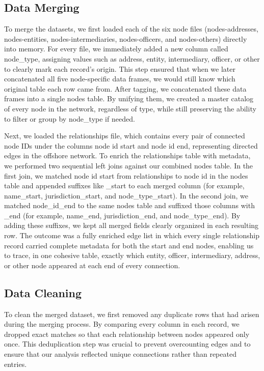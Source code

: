 \documentclass{article}
\begin{document}
\subsection{Data Merging}
To merge the datasets, we first loaded each of the six node files (nodes-addresses, nodes-entities, nodes-intermediaries, nodes-officers, and nodes-others) directly into memory. For every file, we immediately added a new column called node\_type, assigning values such as address, entity, intermediary, officer, or other to clearly mark each record’s origin. This step ensured that when we later concatenated all five node-specific data frames, we would still know which original table each row came from. After tagging, we concatenated these data frames into a single nodes table. By unifying them, we created a master catalog of every node in the network, regardless of type, while still preserving the ability to filter or group by node\_type if needed.

Next, we loaded the relationships file, which contains every pair of connected node IDs under the columns node id start and node id end, representing directed edges in the offshore network. To enrich the relationships table with metadata, we performed two sequential left joins against our combined nodes table. In the first join, we matched node id start from relationships to node id in the nodes table and appended suffixes like \_start to each merged column (for example, name\_start, jurisdiction\_start, and node\_type\_start). In the second join, we matched node\_id\_end to the same nodes table and suffixed those columns with \_end (for example, name\_end, jurisdiction\_end, and node\_type\_end). By adding these suffixes, we kept all merged fields clearly organized in each resulting row. The outcome was a fully enriched edge list in which every single relationship record carried complete metadata for both the start and end nodes, enabling us to trace, in one cohesive table, exactly which entity, officer, intermediary, address, or other node appeared at each end of every connection.

\subsection{Data Cleaning}
To clean the merged dataset, we first removed any duplicate rows that had arisen during the merging process. By comparing every column in each record, we dropped exact matches so that each relationship between nodes appeared only once. This deduplication step was crucial to prevent overcounting edges and to ensure that our analysis reflected unique connections rather than repeated entries.
\end{document}
